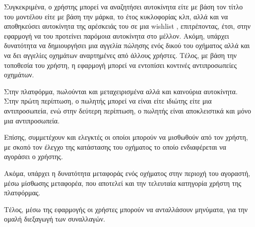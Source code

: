 \documentclass{../ol-softwaremanual}
\begin{document}
	Συγκεκριμένα, ο χρήστης μπορεί να αναζητήσει αυτοκίνητα είτε με βάση τον τίτλο του μοντέλου είτε με βάση την μάρκα, το έτος κυκλοφορίας κλπ, αλλά και να αποθηκεύσει αυτοκίνητα της αρέσκειάς του σε μια \en wishlist \gr, επιτρέποντας, έτσι, στην εφαρμογή να του προτείνει παρόμοια αυτοκίνητα στο μέλλον.
	Ακόμη, υπάρχει δυνατότητα να δημιουργήσει μια αγγελία πώλησης ενός δικού του οχήματος αλλά και να δει αγγελίες οχημάτων αναρτημένες από άλλους χρήστες.
	Τέλος, με βάση την τοποθεσία του χρήστη, η εφαρμογή μπορεί να εντοπίσει κοντινές αντιπροσωπείες οχημάτων. \hfill \break
	
	Στην πλατφόρμα, πωλούνται και μεταχειρισμένα αλλά και καινούρια αυτοκίνητα. Στην πρώτη περίπτωση, ο πωλητής μπορεί να είναι είτε ιδιώτης είτε μια αντιπροσωπεία, ενώ στην δεύτερη περίπτωση, ο πωλητής είναι αποκλειστικά και μόνο μια αντιπροσωπεία. \hfill \break
	
	Επίσης, συμμετέχουν και ελεγκτές οι οποίοι μπορούν να μισθωθούν από τον χρήστη, με σκοπό τον έλεγχο της κατάστασης του οχήματος το οποίο ενδιαφέρεται να αγοράσει ο χρήστης. \hfill \break
	
	Ακόμα, υπάρχει η δυνατότητα μεταφοράς ενός οχήματος στην περιοχή του αγοραστή, μέσω μίσθωσης μεταφορέα, που αποτελεί και την τελευταία κατηγορία χρήστη της πλατφόρμας. \hfill \break
	
	Τέλος, μέσω της εφαρμογής οι χρήστες μπορούν να ανταλλάσουν μηνύματα, για την ομαλή διεξαγωγή των συναλλαγών.
	
	
	
	
	
	\newpage
	
	 \gr
	
	\vspace{60pt}
	
\end{document}
